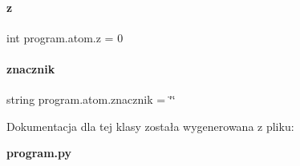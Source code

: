 \mbox{\label{classprogram_1_1atom_a3d70a7f1f2c0245028269b09a9c03cb7}} 
\paragraph{z}
{\footnotesize\ttfamily int program.\+atom.\+z = 0\hspace{0.3cm}{\ttfamily [static]}}

\mbox{\label{classprogram_1_1atom_afe185225ad7639dd04e80a7a99916e6b}} 
\paragraph{znacznik}
{\footnotesize\ttfamily string program.\+atom.\+znacznik = \char`\"{}\char`\"{}\hspace{0.3cm}{\ttfamily [static]}}



Dokumentacja dla tej klasy została wygenerowana z pliku\+:\begin{DoxyCompactItemize}
\item 
\textbf{ program.\+py}\end{DoxyCompactItemize}
